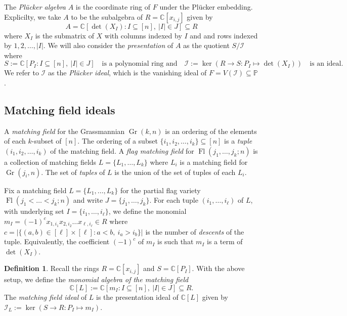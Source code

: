 \documentclass[11pt]{article}
\newcommand{\CC}{\mathbb C}
\newcommand{\PP}{\mathbb P}
\newcommand{\MI}{\mathcal I}
\DeclareMathOperator{\Fl}{Fl}
\DeclareMathOperator{\Gr}{Gr}
\theoremstyle{plain}
\theoremstyle{definition}
\newtheorem{definition}[theorem]{Definition}
\theoremstyle{remark}
\begin{document}
The \textit{Pl\"ucker algebra} $A$ is the coordinate ring of $F$ under the Pl\"ucker embedding. Explicilty, we take $A$ to be the subalgebra of $R = \CC[x_{i,j}]$ given by
\[
A = \CC[\det(X_I) \colon I \subseteq [n], \ |I| \in J] \subseteq R
\]
where $X_I$ is the submatrix of $X$ with columns indexed by $I$ and and rows indexed by $1,2, \dots, |I|$.
We will also consider the \textit{presentation} of $A$ as the quotient $S / \MI$ where 
\[
S := \CC[P_I \colon I \subseteq [n], \ |I| \in J] \quad
\text{is a polynomial ring and}
\quad 
\MI := \ker(R \rightarrow S \colon P_I \mapsto \det(X_I))
\quad \text{is an ideal}.
\]
We refer to $\MI$ as the \textit{Pl\"ucker ideal}, which is the vanishing ideal of $F = V(\MI) \subseteq \PP$.


\subsection{Matching field ideals}\label{sec: bg MF}

A \textit{matching field} for the Grassmannian $\Gr(k,n)$ is an ordering of the elements of each $k$-subset of $[n]$. 
The ordering of a subset $\{i_1, i_2, \dots, i_k\} \subseteq [n]$ is a \textit{tuple} $(i_1, i_2, \dots, i_k)$ of the matching field. A \textit{flag matching field} for $\Fl(j_1, \dots, j_k; n)$ is a collection of matching fields $L = \{L_1, \dots, L_k\}$ where $L_i$ is a matching field for $\Gr(j_i, n)$. The set of \textit{tuples} of $L$ is the union of the set of tuples of each $L_i$.

Fix a matching field $L = \{L_1, \dots, L_k\}$ for the partial flag variety $\Fl(j_1 < \dots < j_k; n)$ and write $J = \{j_1, \dots, j_k\}$. For each tuple $(i_1, \dots, i_\ell)$ of $L$, with underlying set $I = \{i_1, \dots, i_\ell\}$,
we define the monomial $m_I = (-1)^c x_{1, i_1} x_{2, i_2} \dots x_{\ell, i_\ell} \in R$ where $c = |\{(a, b) \in [\ell] \times [\ell] \colon a < b, \ i_a > i_b \}|$ is the number of \textit{descents} of the tuple. Equivalently, the coefficient $(-1)^c$ of $m_I$ is such that $m_I$ is a term of $\det(X_I)$.

\begin{definition}\label{def: bg mf algebra ideal}
    Recall the rings $R = \CC[x_{i,j}]$ and $S = \CC[P_I]$. With the above setup, we define the \textit{monomial algebra of the matching field} 
    \[
    \CC[L] := \CC[m_I \colon I \subseteq [n], \ |I| \in J] \subseteq R.
    \]
    The \textit{matching field ideal} of $L$ is the presentation ideal of $\CC[L]$ given by  $\MI_L := \ker(S \rightarrow R \colon P_I \mapsto m_I)$.
\end{definition}
\end{document}
